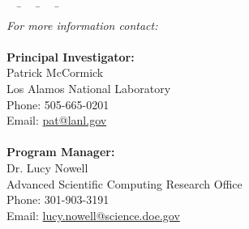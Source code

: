 \documentclass{tcvg}
\newcommand{\email}[1] {\href{mailto:#1}{#1}}
\begin{document}
  
  


  \begin{snugshade}
	\vspace{-0.1in}
    \begin{tabbing}
	  ~~ \= ~~ \= ~~ \= ~~ \=\\
      \emph{For more information contact:}\\
	  \\
      \noindent 
      \> \textbf{Principal Investigator:}\\
	  \>\> Patrick McCormick\\
	  \>\> Los Alamos National Laboratory\\
	  \>\> Phone: 505-665-0201\\
	  \>\> Email: \email{pat@lanl.gov}\\
      \\
	 \> \textbf{Program Manager:}\\
	  \>\> Dr. Lucy Nowell\\
	  \>\> Advanced Scientific Computing Research Office\\
	  \>\> Phone: 301-903-3191\\
	  \>\> Email: \email{lucy.nowell@science.doe.gov}
	\end{tabbing}
  \end{snugshade}  
\end{document}
